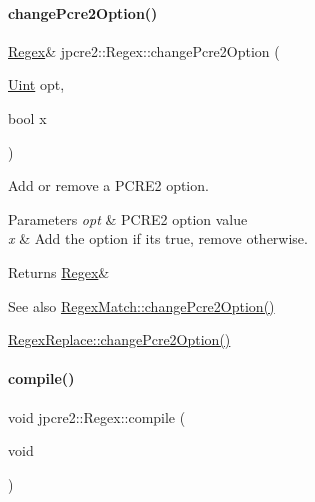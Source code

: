 \paragraph{\texorpdfstring{change\+Pcre2\+Option()}{changePcre2Option()}}
{\footnotesize\ttfamily \hyperlink{classjpcre2_1_1Regex}{Regex}\& jpcre2\+::\+Regex\+::change\+Pcre2\+Option (\begin{DoxyParamCaption}\item[{\hyperlink{namespacejpcre2_a078242d38221a13fb3543b9edd78c099}{Uint}}]{opt,  }\item[{bool}]{x }\end{DoxyParamCaption})\hspace{0.3cm}{\ttfamily [inline]}}



Add or remove a P\+C\+R\+E2 option. 


\begin{DoxyParams}{Parameters}
{\em opt} & P\+C\+R\+E2 option value \\
\hline
{\em x} & Add the option if it\textquotesingle{}s true, remove otherwise. \\
\hline
\end{DoxyParams}
\begin{DoxyReturn}{Returns}
\hyperlink{classjpcre2_1_1Regex}{Regex}\& 
\end{DoxyReturn}
\begin{DoxySeeAlso}{See also}
\hyperlink{classjpcre2_1_1RegexMatch_a6893abc21b24a9d9fca146a33c0f823c_a6893abc21b24a9d9fca146a33c0f823c}{Regex\+Match\+::change\+Pcre2\+Option()} 

\hyperlink{classjpcre2_1_1RegexReplace_aea15c694bba7d994f048596a1f90f71f_aea15c694bba7d994f048596a1f90f71f}{Regex\+Replace\+::change\+Pcre2\+Option()} 
\end{DoxySeeAlso}
\hypertarget{classjpcre2_1_1Regex_aad1d5ef1e87f762f68a587eec4022e69_aad1d5ef1e87f762f68a587eec4022e69}{}\label{classjpcre2_1_1Regex_aad1d5ef1e87f762f68a587eec4022e69_aad1d5ef1e87f762f68a587eec4022e69} 
\paragraph{\texorpdfstring{compile()}{compile()}\hspace{0.1cm}{\footnotesize\ttfamily [1/5]}}
{\footnotesize\ttfamily void jpcre2\+::\+Regex\+::compile (\begin{DoxyParamCaption}\item[{void}]{ }\end{DoxyParamCaption})}



